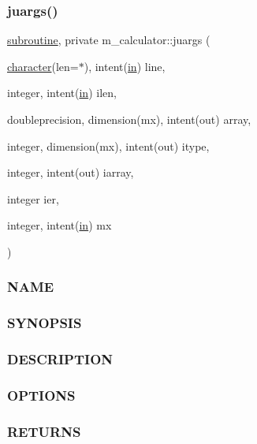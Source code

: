 \subsubsection{\texorpdfstring{juargs()}{juargs()}}
{\footnotesize\ttfamily \hyperlink{M__stopwatch_83_8txt_acfbcff50169d691ff02d4a123ed70482}{subroutine}, private m\+\_\+calculator\+::juargs (\begin{DoxyParamCaption}\item[{\hyperlink{option__stopwatch_83_8txt_abd4b21fbbd175834027b5224bfe97e66}{character}(len=$\ast$), intent(\hyperlink{M__journal_83_8txt_afce72651d1eed785a2132bee863b2f38}{in})}]{line,  }\item[{integer, intent(\hyperlink{M__journal_83_8txt_afce72651d1eed785a2132bee863b2f38}{in})}]{ilen,  }\item[{doubleprecision, dimension(mx), intent(out)}]{array,  }\item[{integer, dimension(mx), intent(out)}]{itype,  }\item[{integer, intent(out)}]{iarray,  }\item[{integer}]{ier,  }\item[{integer, intent(\hyperlink{M__journal_83_8txt_afce72651d1eed785a2132bee863b2f38}{in})}]{mx }\end{DoxyParamCaption})\hspace{0.3cm}{\ttfamily [private]}}



\subsubsection*{N\+A\+ME}

\subsubsection*{S\+Y\+N\+O\+P\+S\+IS}

\subsubsection*{D\+E\+S\+C\+R\+I\+P\+T\+I\+ON}

\subsubsection*{O\+P\+T\+I\+O\+NS}

\subsubsection*{R\+E\+T\+U\+R\+NS}

